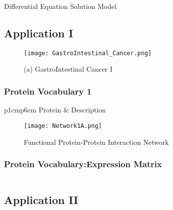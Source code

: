 	
\begin{algorithm}[H]
	\begin{algorithmic}[1]
\end{algorithmic}
	\caption{Differential Equation Solution Model}
	\label{DES_Model}
\end{algorithm}

\subsection{Application I}

\begin{figure}[H]
\begin{minipage}[b]{0.3\linewidth}
\texttt{[image: GastroIntestinal\_Cancer.png]} 
\end{minipage}\hfill
\caption{(a) GastroIntestinal Cancer I}
\label{fig:Figure1}
\end{figure} 

\subsubsection{Protein Vocabulary 1}

\begin{table}[H]\tiny
\caption{Gene and Protein Annotations}	
	\begin{tabular}{p{1cm}p{6cm}}
		\hline
		Protein & Description \\   
		\hline
	\hline
\end{tabular}
\end{table}

\begin{figure}[H]
	\centering
	\begin{minipage}[b]{1\linewidth}
		\texttt{[image: Network1A.png]}
	\end{minipage}\hfill
	\caption{Functional Protein-Protein Interaction Network}
	\label{fig:Figure1}
\end{figure} 


\subsubsection{Protein Vocabulary:Expression Matrix}

\begin{equation}
\end{equation}

\subsection{Application II}

